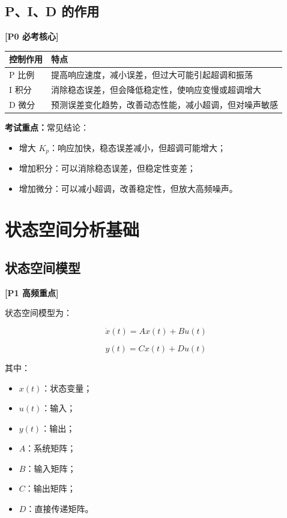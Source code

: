 \documentclass[UTF8,a4paper,12pt]{ctexart}
\newcommand{\Pzero}{\textcolor{p0}{\textbf{[P0 必考核心]}}}
\newcommand{\Pone}{\textcolor{p1}{\textbf{[P1 高频重点]}}}
\newcommand{\exam}{\textcolor{p0}{\textbf{考试重点：}}}
\begin{document}
\subsection{P、I、D 的作用}

\Pzero

\begin{longtable}{p{3cm}p{11cm}}
\toprule
控制作用 & 特点 \\
\midrule
P 比例 & 提高响应速度，减小误差，但过大可能引起超调和振荡 \\
I 积分 & 消除稳态误差，但会降低稳定性，使响应变慢或超调增大 \\
D 微分 & 预测误差变化趋势，改善动态性能，减小超调，但对噪声敏感 \\
\bottomrule
\end{longtable}

\exam 常见结论：

\begin{itemize}
    \item 增大 $K_p$：响应加快，稳态误差减小，但超调可能增大；
    \item 增加积分：可以消除稳态误差，但稳定性变差；
    \item 增加微分：可以减小超调，改善稳定性，但放大高频噪声。
\end{itemize}

\section{状态空间分析基础}

\subsection{状态空间模型}

\Pone

状态空间模型为：

\[
\dot{x}(t)=Ax(t)+Bu(t)
\]

\[
y(t)=Cx(t)+Du(t)
\]

其中：

\begin{itemize}
    \item $x(t)$：状态变量；
    \item $u(t)$：输入；
    \item $y(t)$：输出；
    \item $A$：系统矩阵；
    \item $B$：输入矩阵；
    \item $C$：输出矩阵；
    \item $D$：直接传递矩阵。
\end{itemize}
\end{document}
